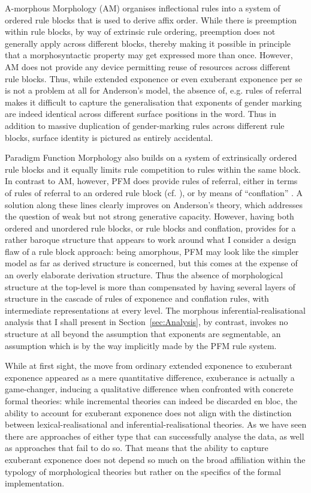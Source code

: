 \documentclass[output=paper]{langsci/langscibook}
\begin{document}
A-morphous Morphology (AM) organises inflectional rules into a system
of ordered rule blocks that is used to derive affix order. While there
is preemption within rule blocks, by way of extrinsic rule ordering,
preemption does not generally apply across different blocks, thereby
making it possible in principle that a morphosyntactic property may
get expressed more than once.  However, AM does not provide any device
permitting reuse of resources across different rule blocks. Thus, while
extended exponence or even exuberant exponence per se is not a problem
at all for Anderson's model, the absence of, e.g. rules of referral
makes it difficult to capture the generalisation that exponents of
gender marking are indeed identical across different surface positions
in the word. Thus in addition to massive duplication of gender-marking
rules across different rule blocks, surface identity is pictured as
entirely accidental.\largerpage

Paradigm Function Morphology also builds on a system of extrinsically
ordered rule blocks and it equally limits rule competition to rules
within the same block. In contrast to AM, however, PFM does provide
rules of referral, either in terms of rules of referral to an ordered
rule block (cf. \citealt{Stump93}), or by means of ``conflation''
\citep{Stump17}. A solution along these lines clearly improves on
Anderson's theory, which addresses the question of weak but not strong
generative capacity. However, having both ordered and unordered rule
blocks, or rule blocks and conflation, provides for a rather baroque
structure that appears to work around what I consider a design flaw of
a rule block approach: being amorphous, PFM may look like the simpler
model as far as derived structure is concerned, but this comes at the
expense of an overly elaborate derivation structure.  Thus the absence
of morphological structure at the top-level is more than compensated
by having several layers of structure in the cascade of rules of
exponence and conflation rules, with intermediate representations at
every level. The morphous inferential-realisational analysis that I
shall present in Section~\ref{sec:Analysis}, by contrast, invokes no
structure at all beyond the assumption that exponents are segmentable,
an assumption which is by the way implicitly made by the PFM rule
system.


While at first sight, the move from ordinary
extended exponence to exuberant exponence appeared as a mere
quantitative difference, exuberance is actually a game-changer,
inducing a qualitative difference when confronted with concrete formal
theories: while incremental theories can indeed be discarded
en bloc, the ability to account for exuberant exponence does
not align with the distinction between lexical-realisational and
inferential-realisational theories. As we have seen there are
approaches of either type that can successfully analyse the data, as
well as approaches that fail to do so. That means that the ability to
capture exuberant exponence does not depend so much on the broad
affiliation within the typology of morphological theories but rather
on the specifics of the formal implementation.
\end{document}
